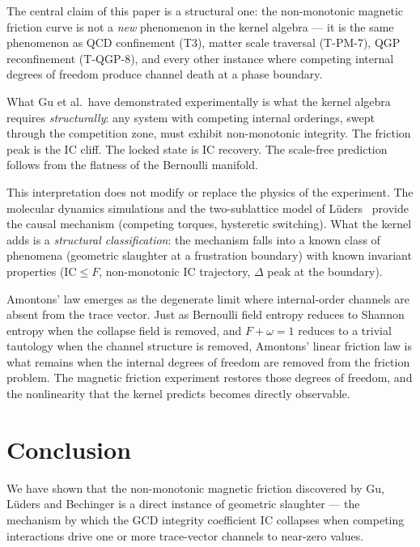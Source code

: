 \documentclass[
  aps,
  prd,
  twocolumn,
  superscriptaddress,
  nofootinbib,
  floatfix
]{revtex4-2}
\newcommand{\IC}{\mathrm{IC}}
\begin{document}
The central claim of this paper is a structural one:
the non-monotonic magnetic friction curve is not a
\emph{new} phenomenon in the kernel algebra --- it
is the same phenomenon as QCD confinement (T3), matter
scale traversal (T-PM-7), QGP reconfinement (T-QGP-8),
and every other instance where competing internal
degrees of freedom produce channel death at a
phase boundary.

What Gu et al.\ have demonstrated experimentally is
what the kernel algebra requires \emph{structurally}:
any system with competing internal orderings, swept
through the competition zone, must exhibit non-monotonic
integrity.  The friction peak is the IC cliff.  The
locked state is IC recovery.  The scale-free prediction
follows from the flatness of the Bernoulli manifold.

This interpretation does not modify or replace the
physics of the experiment.  The molecular dynamics
simulations and the two-sublattice model of
L\"uders~\cite{lueders2026code} provide the
causal mechanism (competing torques, hysteretic switching).
What the kernel adds is a \emph{structural classification}:
the mechanism falls into a known class of phenomena
(geometric slaughter at a frustration boundary) with
known invariant properties ($\IC \leq F$, non-monotonic
IC trajectory, $\Delta$ peak at the boundary).

Amontons' law emerges as the degenerate limit where
internal-order channels are absent from the trace vector.
Just as Bernoulli field entropy reduces to Shannon entropy
when the collapse field is removed, and $F + \omega = 1$
reduces to a trivial tautology when the channel structure
is removed, Amontons' linear friction law is what remains
when the internal degrees of freedom are removed from
the friction problem.  The magnetic friction experiment
restores those degrees of freedom, and the nonlinearity
that the kernel predicts becomes directly observable.

\section{Conclusion}\label{sec:conclusion}

We have shown that the non-monotonic magnetic friction
discovered by Gu, L\"uders and Bechinger is a direct
instance of geometric slaughter --- the mechanism by
which the GCD integrity coefficient $\IC$ collapses
when competing interactions drive one or more trace-vector
channels to near-zero values.
\end{document}
